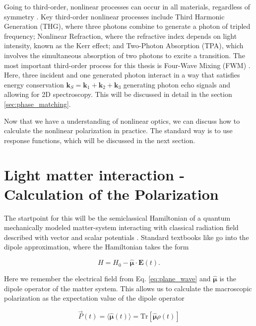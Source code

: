 \noindent
Going to third-order, nonlinear processes can occur in all materials, regardless of symmetry \cite{hamm2005principlesnonlinearoptical}. Key third-order nonlinear processes include Third Harmonic Generation (THG), where three photons combine to generate a photon of tripled frequency; Nonlinear Refraction, where the refractive index depends on light intensity, known as the Kerr effect; and Two-Photon Absorption (TPA), which involves the simultaneous absorption of two photons to excite a transition.
The most important third-order process for this thesis is Four-Wave Mixing (FWM) \cite{boyd2008chapter6nonlinear}. Here, three incident and one generated photon interact in a way that satisfies energy conservation $\mathbf{k}_S = \mathbf{k}_1 + \mathbf{k}_2 + \mathbf{k}_3$ generating photon echo signals and allowing for 2D spectroscopy. This will be discussed in detail in the section \ref{sec:phase_matching}.

\noindent
Now that we have a understanding of nonlinear optics, we can discuss how to calculate the nonlinear polarization in practice. The standard way is to use response functions, which will be discussed in the next section.


\section{Light matter interaction - Calculation of the Polarization}
\label{sec:response_functions}

\noindent
The startpoint for this will be the semiclassical Hamiltonian of a quantum mechanically modeled matter-system interacting with classical radiation field described with vector and scalar potentials .
Standard textbooks like \cite{garrisonchiao2008quantumoptics,gerryknight2024introductoryquantumoptics} go into the dipole approximation, where the Hamiltonian takes the form

\begin{equation}
	H = H_0 - \mathbf{\hat{\mu}} \cdot \mathbf{E}(t).
\end{equation}

\noindent
Here we remember the electrical field from Eq. \ref{eq:plane_wave} and $\mathbf{\hat{\mu}}$ is the dipole operator of the matter system. This allows us to calculate the macroscopic polarization as the expectation value of the dipole operator

\begin{equation}
	\vec{P}(t) = \langle \mathbf{\hat{\mu}}(t) \rangle = \mathrm{Tr}[\mathbf{\hat{\mu}} \rho(t)]
	\label{eq:polarization_expectation_value}
\end{equation}

